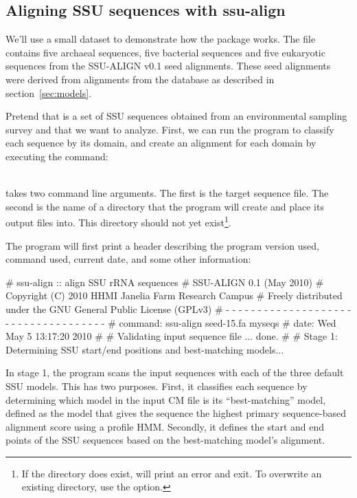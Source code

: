 \subsection{Aligning SSU sequences with ssu-align}

We'll use a small dataset to demonstrate how the package works.
The file  contains five archaeal sequences, five
bacterial sequences and five eukaryotic sequences from the
SSU-ALIGN v0.1 seed alignments. These seed alignments
were derived from alignments from the  database
\cite{CannoneGutell02} as described in section~\ref{sec:models}.

Pretend that  is a set of SSU sequences obtained from
an environmental sampling survey and that we want to analyze. First,
we can run the  program to classify each sequence by
its domain, and create an alignment for each domain by executing the
command:

\\

 takes two command line arguments. The first is the
target sequence file. The second is the name of a directory that the
program will create and place its output files into. This directory
should not yet exist\footnote{If the directory does exist,
   will print an error and exit. To overwrite an
  existing directory, use the  option.}.

The program will first print a header describing the program version
used, command used, current date, and some other information:

\begin{sreoutput}
# ssu-align :: align SSU rRNA sequences
# SSU-ALIGN 0.1 (May 2010)
# Copyright (C) 2010 HHMI Janelia Farm Research Campus
# Freely distributed under the GNU General Public License (GPLv3)
# - - - - - - - - - - - - - - - - - - - - - - - - - - - - - - - - - - - -
# command: ssu-align seed-15.fa myseqs
# date:    Wed May  5 13:17:20 2010
#
# Validating input sequence file ... done.
#
# Stage 1: Determining SSU start/end positions and best-matching models...
\end{sreoutput}

In stage 1, the program scans the input sequences with each of the
three default SSU models. This has two purposes.  First, it classifies
each sequence by determining which model in the input CM file is its
``best-matching'' model, defined as
the model that gives the sequence the highest primary sequence-based
alignment score using a profile HMM\@. Secondly, it
defines the start and end points of the SSU sequences based on the
best-matching model's alignment.

